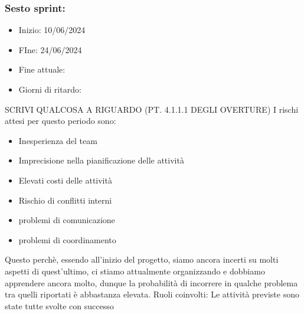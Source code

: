     \subsubsection{Sesto sprint:}
    \begin{itemize}
        \item Inizio: 10/06/2024
        \item FIne: 24/06/2024
        \item Fine attuale:
        \item Giorni di ritardo:
    \end{itemize}
    SCRIVI QUALCOSA A RIGUARDO (PT. 4.1.1.1 DEGLI OVERTURE)
    I rischi attesi per questo periodo sono:
    \begin{itemize}
        \item Inesperienza del team
        \item Imprecisione nella pianificazione delle attività
        \item Elevati costi delle attività
        \item Rischio di conflitti interni 
        \item problemi di comunicazione
        \item problemi di coordinamento
    \end{itemize}
    Questo perchè, essendo all’inizio del progetto, siamo ancora incerti su molti aspetti di quest’ultimo, ci stiamo attualmente organizzando e dobbiamo apprendere ancora molto, dunque la probabilità di incorrere in qualche problema tra quelli riportati è abbastanza elevata.
    Ruoli coinvolti: 
    Le attività previste sono state tutte svolte con successo


